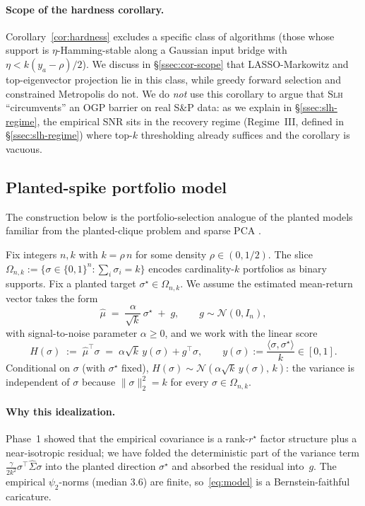 \paragraph{Scope of the hardness corollary.}
Corollary~\ref{cor:hardness} excludes a specific class of algorithms
(those whose support is $\eta$-Hamming-stable along a Gaussian input
bridge with $\eta < k(y_a - \rho)/2$). We discuss in \S\ref{ssec:cor-scope}
that LASSO-Markowitz and top-eigenvector projection lie in this class,
while greedy forward selection and constrained Metropolis do not.
We do \emph{not} use this corollary to argue that \textsc{Slh}
``circumvents'' an OGP barrier on real S\&P data: as we explain in
\S\ref{ssec:slh-regime}, the empirical SNR sits in the recovery regime
(Regime~III, defined in \S\ref{ssec:slh-regime}) where top-$k$ thresholding
already suffices and the corollary is vacuous.

\subsection{Planted-spike portfolio model}

The construction below is the portfolio-selection analogue of the planted models familiar from
the planted-clique problem \cite{gamarnik-zadik-clique} and sparse PCA \cite{ben-arous-wein}.

Fix integers $n,k$ with $k = \rho\, n$ for some density $\rho\in(0,1/2)$. The slice
$\Omega_{n,k} := \{\sigma\in\{0,1\}^n : \sum_{i}\sigma_i = k\}$ encodes cardinality-$k$
portfolios as binary supports. Fix a planted target $\sigma^\star\in\Omega_{n,k}$. We
assume the estimated mean-return vector takes the form
\begin{equation}
\hat\mu \;=\; \frac{\alpha}{\sqrt{k}}\,\sigma^\star \;+\; g, \qquad g\sim\mathcal N(0, I_n),
\label{eq:model}
\end{equation}
with signal-to-noise parameter $\alpha\geq 0$, and we work with the linear
score
\begin{equation}
H(\sigma) \;:=\; \hat\mu^\top\sigma \;=\; \alpha\sqrt{k}\,y(\sigma) + g^\top\sigma,
\qquad y(\sigma) := \frac{\langle\sigma,\sigma^\star\rangle}{k}\in[0,1].
\label{eq:H}
\end{equation}
Conditional on $\sigma$ (with $\sigma^\star$ fixed), $H(\sigma)\sim\mathcal N(\alpha\sqrt
k\,y(\sigma),\, k)$: the variance is independent of $\sigma$ because $\|\sigma\|_2^2=k$
for every $\sigma\in\Omega_{n,k}$.

\paragraph{Why this idealization.} Phase~1 showed that the empirical covariance is a
rank-$r^\star$ factor structure plus a near-isotropic residual; we have folded the
deterministic part of the variance term $\frac{\gamma}{2k^2}\sigma^\top\hat\Sigma\sigma$
into the planted direction $\sigma^\star$ and absorbed the residual into~$g$. The empirical
$\psi_2$-norms (median 3.6) are finite, so~\eqref{eq:model} is a Bernstein-faithful
caricature.

